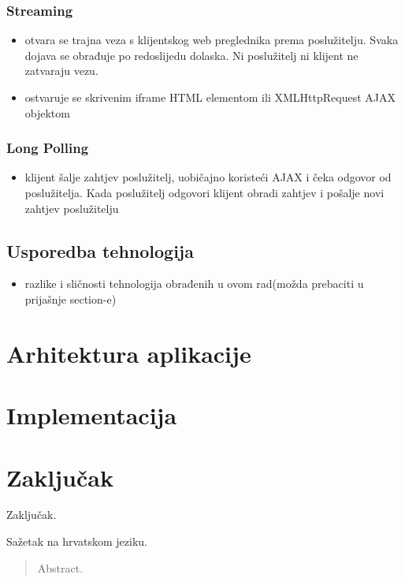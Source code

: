 \documentclass[times, utf8, zavrsni]{fer}
\begin{document}
\subsection{Streaming}
\begin{itemize}
    \item otvara se trajna veza s klijentskog web preglednika prema poslužitelju. Svaka dojava se obrađuje po redoslijedu dolaska. Ni poslužitelj ni klijent ne zatvaraju vezu.
    \item ostvaruje se skrivenim iframe HTML elementom ili XMLHttpRequest AJAX objektom
\end{itemize}

\subsection{Long Polling}
\begin{itemize}
    \item klijent šalje zahtjev poslužitelj, uobičajno koristeći AJAX i čeka odgovor od poslužitelja. Kada poslužitelj odgovori klijent obradi zahtjev i pošalje novi zahtjev poslužitelju
\end{itemize}

\section{Usporedba tehnologija}
\begin{itemize}
    \item razlike i sličnosti tehnologija obrađenih u ovom rad(možda prebaciti u prijašnje section-e)
\end{itemize}

\chapter{Arhitektura aplikacije}
\chapter{Implementacija}


\chapter{Zaključak}
Zaključak.




\begin{sazetak}
Sažetak na hrvatskom jeziku.

\end{sazetak}

\begin{abstract}
Abstract.

\end{abstract}
\end{document}
